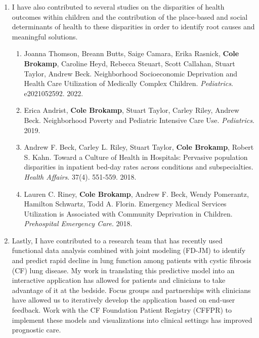 \documentclass{nihbiosketch}
\begin{document}
\begin{enumerate}
\begin{enumerate}
\end{enumerate}

\item I have also contributed to several studies on the disparities of health outcomes within children and the contribution of the place-based and social determinants of health to these disparities in order to identify root causes and meaningful solutions.

\begin{enumerate}

  \item Joanna Thomson, Breann Butts, Saige Camara, Erika Rasnick, \textbf{Cole Brokamp}, Caroline Heyd, Rebecca Steuart, Scott Callahan, Stuart Taylor, Andrew Beck. Neighborhood Socioeconomic Deprivation and Health Care Utilization of Medically Complex Children. \textit{Pediatrics}. e2021052592. 2022.

  \item Erica Andrist, \textbf{Cole Brokamp}, Stuart Taylor, Carley Riley,
  Andrew Beck. Neighborhood Poverty and Pediatric Intensive Care Use.
  \textit{Pediatrics}. 2019.

	\item Andrew F. Beck, Carley L. Riley, Stuart Taylor, \textbf{Cole Brokamp},
    Robert S. Kahn. Toward a Culture of Health in Hospitals: Pervasive
    population disparities in inpatient bed-day rates across conditions and
    subspecialties. \textit{Health Affairs}. 37(4). 551-559. 2018.
		
	\item Lauren C. Riney, \textbf{Cole Brokamp}, Andrew F. Beck, Wendy Pomerantz,
    Hamilton Schwartz, Todd A. Florin. Emergency Medical Services Utilization is
    Associated with Community Deprivation in Children. \textit{Prehospital
      Emergency Care}. 2018.

\end{enumerate}

\item Lastly, I have contributed to a research team that has recently used
  functional data analysis combined with joint modeling (FD-JM) to identify and
  predict rapid decline in lung function among patients with cystic fibrosis
  (CF) lung disease. My work in translating this predictive model into an interactive application has allowed for patients and clinicians to take advantage of it at the bedside.  Focus groups and partnerships with clinicians have allowed us to iteratively develop the application based on end-user feedback. Work with the CF Foundation Patient Registry (CFFPR) to implement these models and visualizations into clinical settings has improved prognostic care.


\end{enumerate}
\end{document}

